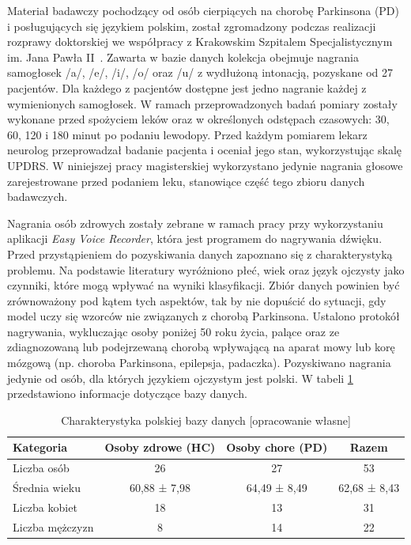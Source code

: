 Materiał badawczy pochodzący od osób cierpiących na chorobę Parkinsona (PD) i posługujących się językiem polskim, został zgromadzony podczas
realizacji rozprawy doktorskiej we współpracy z Krakowskim Szpitalem Specjalistycznym im.
Jana Pawła II~\cite{daria:2018}.
Zawarta w bazie danych kolekcja obejmuje nagrania samogłosek /a/, /e/, /i/, /o/ oraz /u/ z wydłużoną intonacją, pozyskane od 27 pacjentów.
Dla każdego z pacjentów dostępne jest jedno nagranie każdej z wymienionych samogłosek.
W ramach przeprowadzonych badań pomiary zostały wykonane przed spożyciem leków oraz w określonych odstępach czasowych: 30, 60, 120 i 180 minut po podaniu lewodopy.
Przed każdym pomiarem lekarz neurolog przeprowadzał badanie pacjenta i oceniał jego stan, wykorzystując skalę UPDRS\@.
W niniejszej pracy magisterskiej wykorzystano jedynie nagrania głosowe zarejestrowane przed podaniem leku, stanowiące część tego zbioru danych badawczych.

Nagrania osób zdrowych zostały zebrane w ramach pracy przy wykorzystaniu aplikacji \emph{Easy Voice Recorder}, która jest programem do nagrywania dźwięku.
Przed przystąpieniem do pozyskiwania danych zapoznano się z charakterystyką problemu.
Na podstawie literatury wyróżniono płeć, wiek oraz język ojczysty jako czynniki, które mogą wpływać na wyniki klasyfikacji.
Zbiór danych powinien być zrównoważony pod kątem tych aspektów, tak by nie dopuścić do sytuacji, gdy model uczy się wzorców nie związanych z chorobą Parkinsona.
Ustalono protokół nagrywania, wykluczając osoby poniżej 50 roku życia, palące oraz ze zdiagnozowaną lub podejrzewaną chorobą wpływającą na aparat mowy lub korę mózgową (np. choroba Parkinsona, epilepsja, padaczka).
Pozyskiwano nagrania jedynie od osób, dla których językiem ojczystym jest polski.
W tabeli \ref{tab:charakterystyka-bazy-danych} przedstawiono informacje dotyczące bazy danych.

\begin{table}[t]
\centering
\caption{Charakterystyka polskiej bazy danych [opracowanie własne]}
\label{tab:charakterystyka-bazy-danych}
\begin{tabular}{|l|c|c|c|}
\hline
\textbf{Kategoria} &\textbf{Osoby zdrowe (HC)} &\textbf{Osoby chore (PD)} &\textbf{Razem} \\ \hline
Liczba osób &26 &27 &53\\ \hline
Średnia wieku &60,88 ± 7,98 &64,49 ± 8,49  &62,68 ± 8,43\\ \hline
Liczba kobiet &18 &13 &31\\ \hline
Liczba mężczyzn &8 &14 &22 \\ \hline
\end{tabular}
\end{table}

